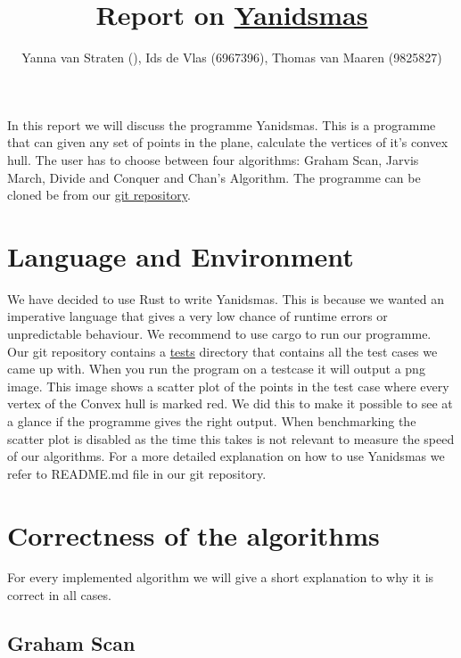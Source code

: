 \documentclass{article}
\title{Report on \href{https://github.com/tvmaaren/GeoAlgBonus-Yanidsmas}{Yanidsmas}}
\author{Yanna van Straten (\todo{7567596}), Ids de Vlas (6967396), Thomas van Maaren (9825827)}
\begin{document}
\maketitle

In this report we will discuss the programme Yanidsmas. This is a programme that can
given any set of points in the plane, calculate the vertices of it's convex hull. The
user has to choose between four algorithms: Graham Scan, Jarvis March, Divide
and Conquer and Chan's Algorithm. The programme can be cloned be from our
\href{https://github.com/tvmaaren/GeoAlgBonus-Yanidsmas}{git repository}.

\section*{Language and Environment}

We have decided to use Rust to write Yanidsmas. This is because we wanted an imperative
language that gives a very low chance of runtime errors or unpredictable behaviour.
We recommend to use cargo to run our programme.
Our git repository contains a \href{https://github.com/tvmaaren/GeoAlgBonus-Yanidsmas/tree/main/tests}{tests} directory that contains all the test cases we came up with.
When you run the program on a testcase it will output a png image. This image shows
a scatter plot of the points in the test case where every vertex of the Convex hull is
marked red. We did this to make it possible to see at a glance if the programme gives
the right output. When benchmarking the scatter plot is disabled as the
time this takes is not relevant to measure the speed of our algorithms. For a more
detailed explanation on how to use Yanidsmas we refer to README.md file in our git repository.

\section*{Correctness of the algorithms}

For every implemented algorithm we will give a short explanation to why it is correct in
all cases.

\subsection*{Graham Scan}
\end{document}
